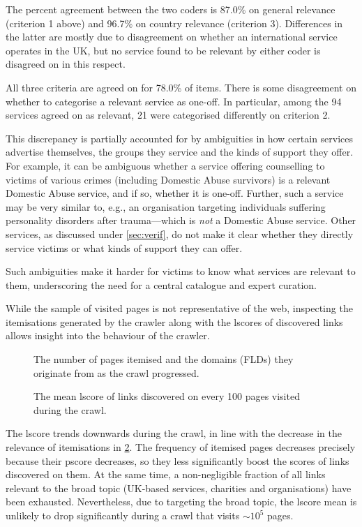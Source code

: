 \documentclass[conference]{IEEEtran}
\begin{document}
The percent agreement between the two coders is 87.0\% on general relevance (criterion 1 above) and 96.7\% on country relevance (criterion 3).
Differences in the latter are mostly due to disagreement on whether an international service operates in the UK, but no service found to be relevant by either coder is disagreed on in this respect.

All three criteria are agreed on for 78.0\% of items. There is some disagreement on whether to categorise a relevant service as one-off.
In particular, among the 94 services agreed on as relevant, 21 were categorised differently on criterion 2.

This discrepancy is partially accounted for by ambiguities in how certain services advertise themselves, the groups they service and the kinds of support they offer.
For example, it can be ambiguous whether a service offering counselling to victims of various crimes (including Domestic Abuse survivors) is a relevant Domestic Abuse service, and if so, whether it is one-off.
Further, such a service may be very similar to, e.g., an organisation targeting individuals suffering personality disorders after trauma---which is \textit{not} a Domestic Abuse service.
Other services, as discussed under \cref{sec:verif}, do not make it clear whether they directly service victims or what kinds of support they can offer.

Such ambiguities make it harder for victims to know what services are relevant to them, underscoring the need for a central catalogue and expert curation.

While the sample of visited pages is not representative of the web, inspecting the itemisations generated by the crawler along with the lscores of discovered links allows insight into the behaviour of the crawler.

\begin{figure}
    \centering
    \resizebox{9cm}{!}{}
    \caption{The number of pages itemised and the domains (FLDs) they originate from as the crawl progressed.}
    \label{fig:items}
\end{figure}

\begin{figure}
    \centering
    \resizebox{9cm}{!}{}
    \caption{The mean lscore of links discovered on every 100 pages visited during the crawl.}
    \label{fig:lscore}
\end{figure}

The lscore trends downwards during the crawl, in line with the decrease in the relevance of itemisations in \cref{fig:lscore}.
The frequency of itemised pages decreases precisely because their pscore decreases, so they less significantly boost the scores of links discovered on them.
At the same time, a non-negligible fraction of all links relevant to the broad topic (UK-based services, charities and organisations) have been exhausted.
Nevertheless, due to targeting the broad topic, the lscore mean is unlikely to drop significantly during a crawl that visits ${\sim}10^5$ pages.
\end{document}
